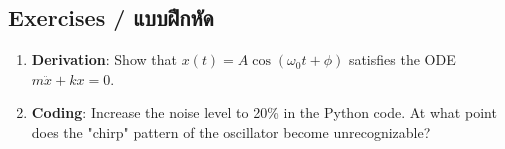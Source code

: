 \subsection{Exercises \quad / \quad \textthai{แบบฝึกหัด}}
\begin{enumerate}
    \item \textbf{Derivation}: Show that $x(t) = A \cos(\omega_0 t + \phi)$ satisfies the ODE $m \ddot{x} + kx = 0$.
    \item \textbf{Coding}: Increase the noise level to 20\% in the Python code. At what point does the "chirp" pattern of the oscillator become unrecognizable?
\end{enumerate}
